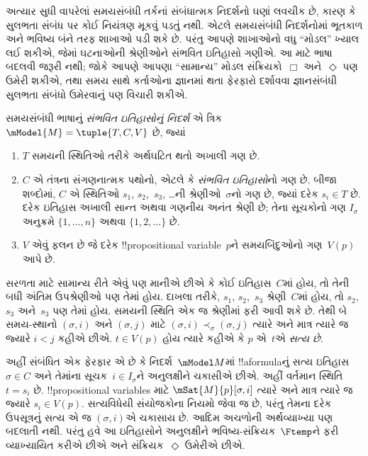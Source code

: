 \documentclass[../../../include/open-logic-section]{subfiles}
\begin{document}


અત્યાર સુધી વાપરેલાં સમયસંબંધી તર્કનાં સંબંધાત્મક નિદર્શનો ઘણાં
લવચીક છે, કારણ કે સુલભતા સંબંધ પર કોઈ નિયંત્રણ મૂકવું પડતું નથી.
એટલે સમયસંબંધી નિદર્શનોમાં ભૂતકાળ અને ભવિષ્ય બંને તરફ શાખાઓ પડી
શકે છે. પરંતુ આપણે શાખાઓનો વધુ ``મોડલ'' ખ્યાલ લઈ શકીએ, જેમાં
ઘટનાઓની શ્રેણીઓને સંભવિત ઇતિહાસો ગણીએ. આ માટે ભાષા બદલવી જરૂરી
નથી; જોકે આપણે આપણા ``સામાન્ય'' મોડલ સંક્રિયકો~$\Box$ અને~$\Diamond$
પણ ઉમેરી શકીએ, તથા સમય સાથે કર્તાઓના જ્ઞાનમાં થતા ફેરફારો દર્શાવવા
જ્ઞાનસંબંધી સુલભતા સંબંધો ઉમેરવાનું પણ વિચારી શકીએ.

\begin{defn}
  સમયસંબંધી ભાષાનું \emph{સંભવિત ઇતિહાસોનું નિદર્શ} એ ત્રિક
  $\mModel{M} = \tuple{T, C, V}$ છે, જ્યાં
  \begin{enumerate}
    \item $T$ સમયની સ્થિતિઓ તરીકે અર્થઘટિત થતો અખાલી ગણ છે.
    \item $C$ એ તંત્રના સંગણનાત્મક પથોનો, એટલે કે \emph{સંભવિત
      ઇતિહાસો}નો ગણ છે. બીજા શબ્દોમાં, $C$ એ સ્થિતિઓ
      $s_1$, $s_2$,~$s_3$, \dots ની શ્રેણીઓ~$\sigma$નો ગણ છે,
      જ્યાં દરેક $s_i \in T$ છે. દરેક ઇતિહાસ અખાલી સાન્ત
      અથવા ગણનીય અનંત શ્રેણી છે; તેના સૂચકોનો ગણ $I_\sigma$
      અનુક્રમે $\{1,\ldots,n\}$ અથવા $\{1,2,\ldots\}$ છે.
    \item $V$ એવું ફલન છે જે દરેક !!{propositional
      variable}~$p$ને સમયબિંદુઓનો ગણ~$V(p)$ આપે છે.
  \end{enumerate}
  સરળતા માટે સામાન્ય રીતે એવું પણ માનીએ છીએ કે કોઈ ઇતિહાસ~$C$માં
  હોય, તો તેની બધી અંતિમ ઉપશ્રેણીઓ પણ તેમાં હોય. દાખલા તરીકે,
  $s_1$, $s_2$,~$s_3$ શ્રેણી~$C$માં હોય, તો $s_2$, $s_3$ અને~$s_3$
  પણ તેમાં હોય. સમયની સ્થિતિ એક જ શ્રેણીમાં ફરી આવી શકે છે.
  તેથી બે સમય-સ્થાનો $(\sigma,i)$ અને $(\sigma,j)$ માટે
  $(\sigma,i) \prec_\sigma (\sigma,j)$ ત્યારે અને માત્ર ત્યારે જ
  જ્યારે $i<j$ કહીએ છીએ.
  $t \in V(p)$ હોય ત્યારે કહીએ કે $p$ એ~$t$એ \emph{સત્ય છે}.
\end{defn}

અહીં સંબંધિત એક ફેરફાર એ છે કે નિદર્શ~$\mModel M$માં
!!a{formula}નું સત્ય ઇતિહાસ~$\sigma\in C$ અને તેમાંના
સૂચક~$i\in I_\sigma$ને અનુલક્ષીને ચકાસીએ છીએ.
અહીં વર્તમાન સ્થિતિ $t=s_i$ છે. !!{propositional
variable}s માટે $\mSat{M}{p}[\sigma,i]$ ત્યારે અને માત્ર ત્યારે જ
જ્યારે $s_i\in V(p)$. સત્યવિધેયી સંયોજકોના નિયમો
 જેવા જ છે, પરંતુ તેમના દરેક ઉપસૂત્રનું
સત્ય એ જ $(\sigma,i)$એ ચકાસાય છે. આદિમ અચળોની અર્થવ્યાખ્યા પણ
બદલાતી નથી.
પરંતુ હવે આ ઇતિહાસોને અનુલક્ષીને ભવિષ્ય-સંક્રિયક~$\Ftemp$ને ફરી
વ્યાખ્યાયિત કરીએ છીએ અને સંક્રિયક~$\Diamond$ ઉમેરીએ છીએ.
\end{document}
